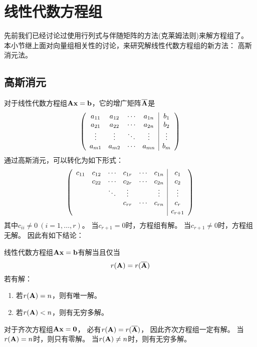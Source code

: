 \section{线性代数方程组}
先前我们已经讨论过使用行列式与伴随矩阵的方法(克莱姆法则)来解方程组了。
本小节继上面对向量组相关性的讨论，来研究解线性代数方程组的新方法：
高斯消元法。

\subsection{高斯消元}
对于线性代数方程组$\mmA\mvx=\mvb$，它的增广矩阵$\overline{\mmA}$是
\begin{displaymath}
  \mmat{cccc|c}{
    a_{11} & a_{12} & \cdots & a_{1n} & b_1 \\
    a_{21} & a_{22} & \cdots & a_{2n} & b_2 \\
    \vdots & \vdots & \ddots & \vdots & \vdots \\
    a_{m1} & a_{m2} & \cdots & a_{mn} & b_m
  }
\end{displaymath}
通过高斯消元，可以转化为如下形式：
\begin{equation} \label{eq-gauss-elim}
  \mmat{cccccc|c}{
    c_{11} & c_{12} & \cdots & c_{1r} & \cdots & c_{1n} & c_1    \\
           & c_{22} & \cdots & c_{2r} & \cdots & c_{2n} & c_2    \\
           &        & \ddots & \vdots &        & \vdots & \vdots \\
           &        &        & c_{rr} & \cdots & c_{rn} & c_r    \\
           &        &        &        &        &        & c_{r+1}
  }
\end{equation}
其中$c_{ii}\neq 0\ (i=1,\dots,r)$。
当$c_{r+1}=0$时，方程组有解。
当$c_{r+1}\neq 0$时，方程组无解。
因此有如下结论：

\begin{theorem}[线性代数方程组有解的充要条件]
  线性代数方程组$\mmA\mvx=\mvb$有解当且仅当
  \[ r(\mmA) = r(\overline{\mmA}) \]
  若有解：
  \begin{enumerate}
    \item 若$r(\mmA)=n$，则有唯一解。
    \item 若$r(\mmA) < n$，则有无穷多解。
  \end{enumerate}
\end{theorem}

\begin{remark}
  对于齐次方程组$\mmA\mvx=\mvZero$，
  必有$r(\mmA)=r(\overline{\mmA})$，
  因此齐次方程组一定有解。
  当$r(\mmA)=n$时，则只有零解。
  当$r(\mmA)\neq n$时，则有无穷多解。
\end{remark}

